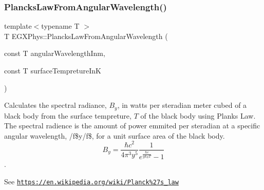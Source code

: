 \subsubsection{\texorpdfstring{Plancks\+Law\+From\+Angular\+Wavelength()}{PlancksLawFromAngularWavelength()}}
{\footnotesize\ttfamily template$<$typename T $>$ \\
T E\+G\+X\+Phys\+::\+Plancks\+Law\+From\+Angular\+Wavelength (\begin{DoxyParamCaption}\item[{const T}]{angular\+Wavelength\+Inm,  }\item[{const T}]{surface\+Tempreture\+InK }\end{DoxyParamCaption})}



Calculates the spectral radiance, $B_{y}$, in watts per steradian meter cubed of a black body from the surface tempreture, $T$ of the black body using Plank\textquotesingle{}s Law. The spectral radience is the amount of power emmited per steradian at a specific angular wavelength, /f\$y/f\$, for a unit surface area of the black body. \[ B_{y} = \dfrac{\hbar c^2}{4\pi^3y^5} \dfrac{1}{e^{\frac{\hbar c}{y k_B T}} - 1} \]. 

See \href{https://en.wikipedia.org/wiki/Planck%27s_law}{\tt https\+://en.\+wikipedia.\+org/wiki/\+Planck\%27s\+\_\+law}


